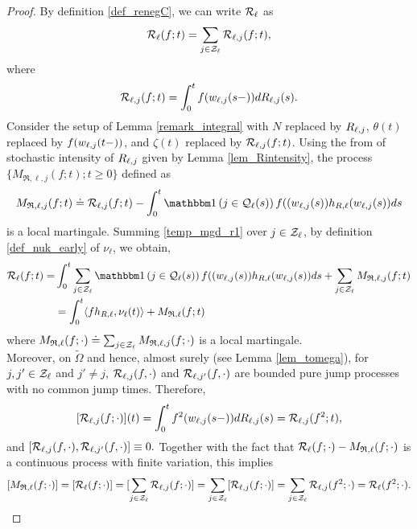 \documentclass{article}
\theoremstyle{definition}
\numberwithin{equation}{section}
\begin{document}
\begin{proof}
  By definition \eqref{def_renegC}, we can write $\mathcal{R}_\ell$ as
\begin{equation}\label{def_Rl_decomp}
\mathcal{R}_\ell(f;t)=\sum_{j\in\mathcal{Z}_\ell} \mathcal{R}_{\ell,j}(f;t),
\end{equation}
where
\begin{equation}\label{def_RClj}
\mathcal{R}_{\ell,j}(f;t)= \int_0^tf(w_{\ell,j}(s-))dR_{\ell,j}(s).
\end{equation}
Consider the setup of Lemma \ref{remark_integral} with $N$ replaced by $R_{\ell,j}$,  $\theta(t)$ replaced by $f(w_{\ell,j}(t-))$, and $\zeta(t)$ replaced by $\mathcal{R}_{\ell,j}(f;t)$. Using the from of stochastic intensity of $R_{\ell,j}$ given by Lemma \ref{lem_Rintensity}, the process $\{M_{\mathfrak{R},\ell,j}(f;t);t\geq0\}$ defined as
\begin{equation}\label{temp_mgd_r1}
M_{\mathfrak{R},\ell,j}(f;t) \doteq \renegC_{\ell,j}(f;t) - \int_0^t \indic{j\in\inque_\ell(s)} f((\waiting_{\ell,j}(s)) h_{R,\ell}(\waiting_{\ell,j}(s))ds
\end{equation}
is a local martingale. Summing \eqref{temp_mgd_r1} over $j\in\mathcal{Z}_\ell$, by definition \eqref{def_nuk_early} of $\nu_\ell$, we obtain,
\begin{align*}
  \renegC_\ell(f;t) = &  \int_0^t \sum_{j\in\indexSet_\ell} \indic{j\in\inque_\ell(s)} f((\waiting_{\ell,j}(s)) h_{R,\ell}(\waiting_{\ell,j}(s))ds + \sum_{j\in\indexSet_\ell}M_{\mathfrak{R},\ell,j}(f;t)\\
  & = \int_0^t \langle f h_{R,\ell},\nu_\ell(t) \rangle + M_{\mathfrak{R},\ell}(f;t)
\end{align*}
where $M_{\mathfrak{R},\ell} (f;\cdot)\doteq \sum_{j\in \mathcal{Z}_\ell}M_{\mathfrak{R},\ell,j}(f;\cdot)$ is a local martingale.\\


Moreover, on $\tilde\Omega$ and hence, almost surely (see Lemma \ref{lem_tomega}), for $j,j'\in\mathcal{Z}_\ell$  and $j'\neq j$, $\mathcal{R}_{\ell,j}(f,\cdot)$ and $\mathcal{R}_{\ell,j'}(f,\cdot)$ are bounded pure jump processes with no common jump times. Therefore,
\[
[\mathcal{R}_{\ell,j}(f;\cdot)](t) = \int_{0}^{t} f^2(w_{\ell,j}(s-))dR_{\ell,j}(s) = \mathcal{R}_{\ell,j}(f^2;t),
\]
and $[ \mathcal{R}_{\ell,j}(f,\cdot),\mathcal{R}_{\ell,j'}(f,\cdot)] \equiv 0.$  Together with the fact that $\mathcal{R}_{\ell}(f;\cdot)-M_{\mathfrak{R},\ell}(f;\cdot)$ is a continuous process with finite variation, this implies
\[ [M_{\mathfrak{R},\ell}(f;\cdot)] = [\mathcal{R}_{\ell}(f;\cdot)] = [\sum_{j\in\mathcal{Z}_\ell}\mathcal{R}_{\ell,j}(f;\cdot)] = \sum_{j\in\mathcal{Z}_\ell}[\mathcal{R}_{\ell,j}(f;\cdot)] =\sum_{j\in\mathcal{Z}_\ell}\mathcal{R}_{\ell,j}(f^2;\cdot)=\mathcal{R}_{\ell}(f^2;\cdot). \]
\end{proof}
\end{document}
